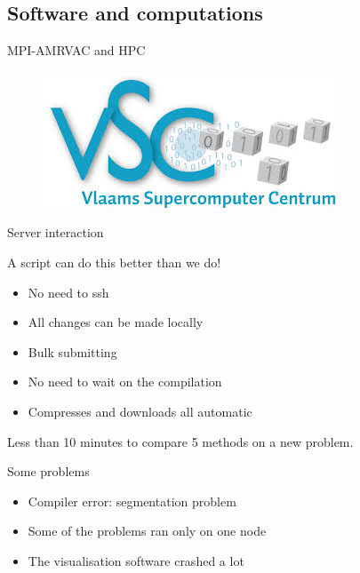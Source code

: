 \subsection{Software and computations}

\begin{frame}{MPI-AMRVAC and HPC}


\begin{figure}
\centering
\includegraphics[width=0.7\linewidth]{../../figs/vsc}
\label{fig:vsc}
\end{figure}

\end{frame}


\begin{frame}{Server interaction}

A script can do this better than we do!

\begin{itemize}
\item No need to ssh
\item All changes can be made locally 
\item Bulk submitting
\item No need to wait on the compilation
\item Compresses and downloads all automatic
\end{itemize}

Less than 10 minutes to compare 5 methods on a new problem.
\end{frame}

\begin{frame}{Some problems}
\vspace{2cm}
\begin{itemize}
\item Compiler error: segmentation problem
\item Some of the problems ran only on one node 
\item The visualisation software crashed a lot
\end{itemize}

\end{frame}